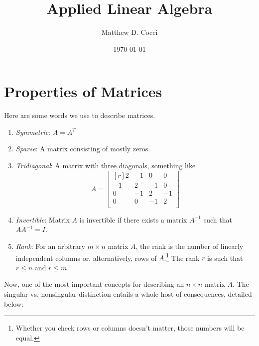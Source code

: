 \documentclass[12pt]{article}
\author{Matthew D. Cocci}
\title{Applied Linear Algebra}
\date{\today}
\theoremstyle{plain}
\theoremstyle{definition}
\theoremstyle{remark}
\begin{document}
\maketitle


\newpage
\section{Properties of Matrices}

Here are some words we use to describe matrices.
\begin{enumerate}
\item \emph{Symmetric}: $A=A^T$
\item \emph{Sparse}: A matrix consisting of mostly zeros.
\item \emph{Tridiagonal}: A matrix with three diagonals, something like
\[
  A =
  \begin{bmatrix}[r]
   2 & -1 &  0 &  0 \\
  -1 & 2 & -1 &  0 \\
   0 & -1 &  2 & -1 \\
   0 &  0 & -1 &  2 \\
  \end{bmatrix}
\]
\item \emph{Invertible}: Matrix $A$ is invertible if there exists a matrix $A^{-1}$ such that $A A^{-1} = I$.

\item \emph{Rank}: For an arbitrary $m\times n$ matrix $A$, the rank is the number of linearly independent columns or, alternatively, rows of $A$.\footnote{Whether you check rows or columns doesn't matter, those numbers will be equal.} The rank $r$ is such that $r \leq n$ and $r\leq m$.
\end{enumerate}
Now, one of the most important concepts for describing an $n\times n$ matrix $A$. The singular vs. nonsingular distinction entails a whole host of consequences, detailed below:
\end{document}
